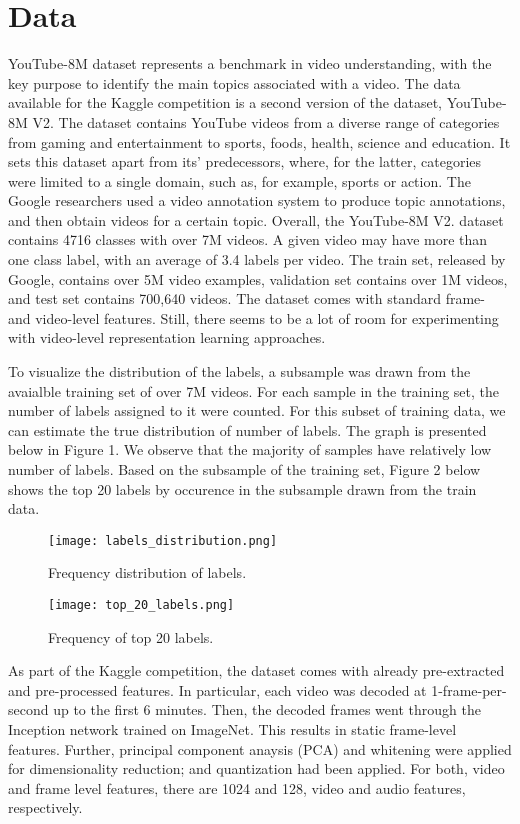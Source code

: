 \documentclass{sig-alternate-05-2015}
\begin{document}
\section{Data}
YouTube-8M dataset represents a benchmark in video understanding, with the key purpose to identify the main topics associated with a video. The data available for the Kaggle competition is a second version of the dataset, YouTube-8M V2. The dataset contains YouTube videos from a diverse range of categories from gaming and entertainment  to sports, foods, health, science and education. It sets this dataset apart from its' predecessors, where, for the latter, categories were limited to a single domain, such as, for example, sports or action. The Google researchers used a video annotation system to produce topic annotations, and then obtain videos for a certain topic. Overall, the YouTube-8M V2. dataset contains 4716 classes with over 7M videos. A given video may have more than one class label, with an average of 3.4 labels per video. The train set, released by Google, contains over 5M video examples, validation set contains over 1M videos, and test set contains 700,640 videos. The dataset comes with standard frame- and video-level features. Still, there seems to be a lot of room for experimenting with video-level representation learning approaches.

To visualize the distribution of the labels, a subsample was drawn from the avaialble training set of over 7M videos. For each sample in the training set, the number of labels assigned to it were counted. For this subset of training data, we can estimate the true distribution of number of labels. The graph is presented below in Figure 1. We observe that the majority of samples have relatively low number of labels. Based on the subsample of the training set, Figure 2 below shows the top 20 labels by occurence in the subsample drawn from the train data. 

\begin{figure}[h!]
\noindent
\small\caption{Frequency distribution of labels. }\small
\texttt{[image: labels\_distribution.png]}
\end{figure}


\begin{figure}[h!]
\noindent
\small\caption{Frequency of top 20 labels. }\small
\texttt{[image: top\_20\_labels.png]}
\end{figure}

\noindent
As part of the Kaggle competition, the dataset comes with already pre-extracted and pre-processed features. In particular, each video was decoded at 1-frame-per-second up to the first 6 minutes. Then, the decoded frames went through the Inception network trained on ImageNet. This results in static frame-level features. Further, principal component anaysis (PCA) and whitening were applied for dimensionality reduction; and quantization had been applied. For both, video and frame level features, there are 1024 and 128, video and audio features, respectively. 
\end{document}
